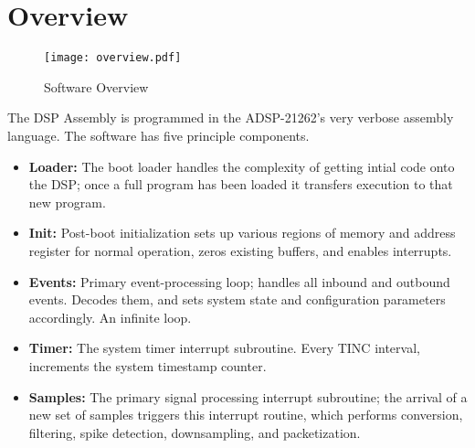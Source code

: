 
\section{Overview}

\begin{figure}[h!]
\begin{center}
\texttt{[image: overview.pdf]}
\end{center}
\caption{Software Overview}
\label{overview}
\end{figure}

The DSP Assembly is programmed in the ADSP-21262's very verbose assembly language. The software has five principle components.

\begin{itemize}
\item \textbf{Loader:} The boot loader handles the complexity of getting intial code onto the DSP; once a full program has been loaded it transfers execution to that new program. 

\item \textbf{Init:} Post-boot initialization sets up various regions of memory and address register for normal operation, zeros existing buffers, and enables interrupts. 

\item \textbf{Events:} Primary event-processing loop; handles all inbound and outbound events. Decodes them, and sets system state and configuration parameters accordingly. An infinite loop. 

\item \textbf{Timer:} The system timer interrupt subroutine. Every TINC interval, increments the system timestamp counter. 

\item \textbf{Samples:} The primary signal processing interrupt subroutine; the arrival of a new set of samples triggers this interrupt routine, which performs conversion, filtering, spike detection, downsampling, and packetization. 

\end{itemize}
